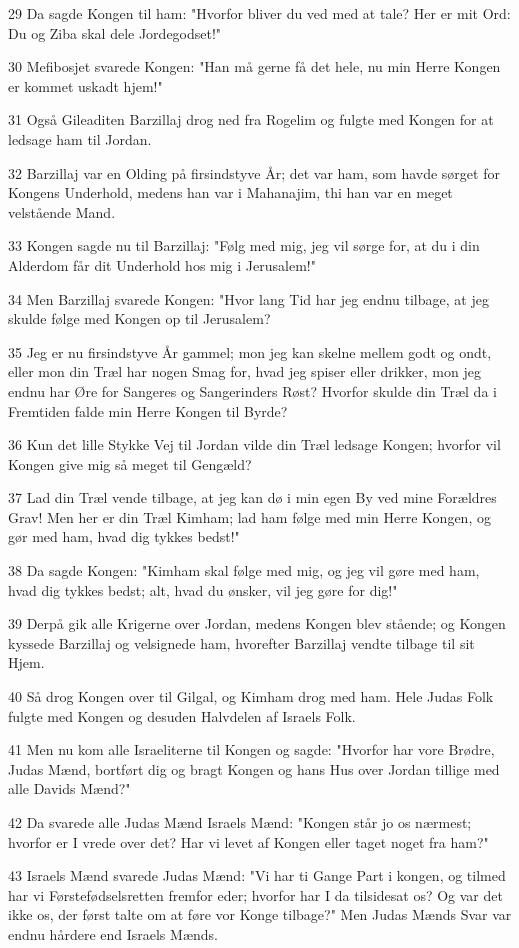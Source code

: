 \par 29 Da sagde Kongen til ham: "Hvorfor bliver du ved med at tale? Her er mit Ord: Du og Ziba skal dele Jordegodset!"
\par 30 Mefibosjet svarede Kongen: "Han må gerne få det hele, nu min Herre Kongen er kommet uskadt hjem!"
\par 31 Også Gileaditen Barzillaj drog ned fra Rogelim og fulgte med Kongen for at ledsage ham til Jordan.
\par 32 Barzillaj var en Olding på firsindstyve År; det var ham, som havde sørget for Kongens Underhold, medens han var i Mahanajim, thi han var en meget velstående Mand.
\par 33 Kongen sagde nu til Barzillaj: "Følg med mig, jeg vil sørge for, at du i din Alderdom får dit Underhold hos mig i Jerusalem!"
\par 34 Men Barzillaj svarede Kongen: "Hvor lang Tid har jeg endnu tilbage, at jeg skulde følge med Kongen op til Jerusalem?
\par 35 Jeg er nu firsindstyve År gammel; mon jeg kan skelne mellem godt og ondt, eller mon din Træl har nogen Smag for, hvad jeg spiser eller drikker, mon jeg endnu har Øre for Sangeres og Sangerinders Røst? Hvorfor skulde din Træl da i Fremtiden falde min Herre Kongen til Byrde?
\par 36 Kun det lille Stykke Vej til Jordan vilde din Træl ledsage Kongen; hvorfor vil Kongen give mig så meget til Gengæld?
\par 37 Lad din Træl vende tilbage, at jeg kan dø i min egen By ved mine Forældres Grav! Men her er din Træl Kimham; lad ham følge med min Herre Kongen, og gør med ham, hvad dig tykkes bedst!"
\par 38 Da sagde Kongen: "Kimham skal følge med mig, og jeg vil gøre med ham, hvad dig tykkes bedst; alt, hvad du ønsker, vil jeg gøre for dig!"
\par 39 Derpå gik alle Krigerne over Jordan, medens Kongen blev stående; og Kongen kyssede Barzillaj og velsignede ham, hvorefter Barzillaj vendte tilbage til sit Hjem.
\par 40 Så drog Kongen over til Gilgal, og Kimham drog med ham. Hele Judas Folk fulgte med Kongen og desuden Halvdelen af Israels Folk.
\par 41 Men nu kom alle Israeliterne til Kongen og sagde: "Hvorfor har vore Brødre, Judas Mænd, bortført dig og bragt Kongen og hans Hus over Jordan tillige med alle Davids Mænd?"
\par 42 Da svarede alle Judas Mænd Israels Mænd: "Kongen står jo os nærmest; hvorfor er I vrede over det? Har vi levet af Kongen eller taget noget fra ham?"
\par 43 Israels Mænd svarede Judas Mænd: "Vi har ti Gange Part i kongen, og tilmed har vi Førstefødselsretten fremfor eder; hvorfor har I da tilsidesat os? Og var det ikke os, der først talte om at føre vor Konge tilbage?" Men Judas Mænds Svar var endnu hårdere end Israels Mænds.

